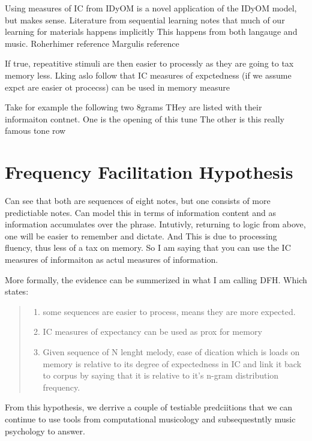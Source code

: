 \documentclass[]{book}
\providecommand{\tightlist}{%
  \setlength{\itemsep}{0pt}\setlength{\parskip}{0pt}}
\begin{document}
Using measures of IC from IDyOM is a novel application of the IDyOM model, but makes sense.
Literature from sequential learning notes that much of our learning for materials happens implicitly
This happens from both langauge and music.
Roherhimer reference
Margulis reference

If true, repeatitive stimuli are then easier to processly as they are going to tax memory less.
Lking aslo follow that IC measures of expctedness (if we assume expct are easier ot procecss) can be used in memory measure

Take for example the following two 8grams
THey are listed with their informaiton contnet.
One is the opening of this tune
The other is this really famous tone row

\hypertarget{frequency-facilitation-hypothesis}{%
\section{Frequency Facilitation Hypothesis}\label{frequency-facilitation-hypothesis}}

Can see that both are sequences of eight notes, but one consists of more predictiable notes.
Can model this in terms of information content and as information accumulates over the phrase.
Intutivly, returning to logic from above, one will be easier to remember and dictate.
And This is due to processing fluency, thus less of a tax on memory.
So I am saying that you can use the IC measures of informaiton as actul measures of information.

More formally, the evidence can be summerized in what I am calling DFH.
Which states:

\begin{quote}
\begin{enumerate}
\def\labelenumi{\arabic{enumi}.}
\tightlist
\item
  some sequences are easier to process, means they are more expected.
\item
  IC measures of expectancy can be used as prox for memory
\item
  Given sequence of N lenght melody, ease of dication which is loads on memory is relative to its degree of expectedness in IC and link it back to corpus by saying that it is relative to it's n-gram distribution frequency.
\end{enumerate}
\end{quote}

From this hypothesis, we derrive a couple of testiable predciitions that we can continue to
use tools from computational musicology and subsequestntly music psychology to answer.
\end{document}
